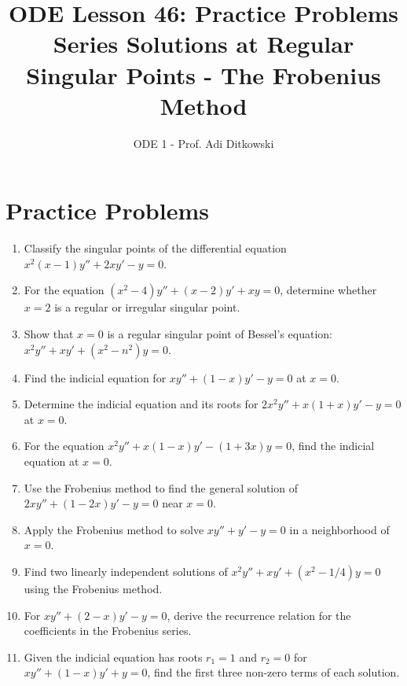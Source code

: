 \documentclass[12pt]{article}
\title{ODE Lesson 46: Practice Problems\\Series Solutions at Regular Singular Points - The Frobenius Method}
\author{ODE 1 - Prof. Adi Ditkowski}
\date{}
\begin{document}
\maketitle

\section*{Practice Problems}

\begin{enumerate}[label=\textbf{\arabic*.}]

\item Classify the singular points of the differential equation $x^2(x-1)y'' + 2xy' - y = 0$.

\item For the equation $(x^2-4)y'' + (x-2)y' + xy = 0$, determine whether $x = 2$ is a regular or irregular singular point.

\item Show that $x = 0$ is a regular singular point of Bessel's equation: $x^2y'' + xy' + (x^2 - n^2)y = 0$.

\item Find the indicial equation for $xy'' + (1-x)y' - y = 0$ at $x = 0$.

\item Determine the indicial equation and its roots for $2x^2y'' + x(1+x)y' - y = 0$ at $x = 0$.

\item For the equation $x^2y'' + x(1-x)y' - (1+3x)y = 0$, find the indicial equation at $x = 0$.

\item Use the Frobenius method to find the general solution of $2xy'' + (1-2x)y' - y = 0$ near $x = 0$.

\item Apply the Frobenius method to solve $xy'' + y' - y = 0$ in a neighborhood of $x = 0$.

\item Find two linearly independent solutions of $x^2y'' + xy' + (x^2 - 1/4)y = 0$ using the Frobenius method.

\item For $xy'' + (2-x)y' - y = 0$, derive the recurrence relation for the coefficients in the Frobenius series.

\item Given the indicial equation has roots $r_1 = 1$ and $r_2 = 0$ for $xy'' + (1-x)y' + y = 0$, find the first three non-zero terms of each solution.


\end{enumerate}
\end{document}
